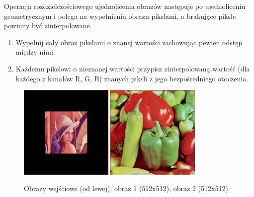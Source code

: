 \documentclass[final,a4paper,openany,12pt]{mwbk}
\begin{document}
Operacja rozdzielczościowego ujednolicenia obrazów następuje po ujednoliceniu geometrycznym i polega na wypełnieniu obrazu pikslami, a brakujące piksle powinny być zinterpolowane.
\begin{enumerate}
	\item Wypełnij cały obraz pikslami o znanej wartości zachowując pewien odstęp między nimi.
	\item Każdemu pikslowi o nieznanej wartości przypisz zinterpolowaną wartość (dla każdego z kanałów R, G, B) znanych piksli z jego bezpośredniego otoczenia.
\end{enumerate}

\begin{figure}[H]
	\begin{center}
		\includegraphics[width=0.4\textwidth]{lena_color_unificationGeo_result}
		\includegraphics[width=0.4\textwidth]{peppers_color_unificationGeo_result}
	\end{center}
	\caption{Obrazy wejściowe (od lewej): obraz 1 (512x512), obraz 2 (512x512)}
\end{figure}
\end{document}
